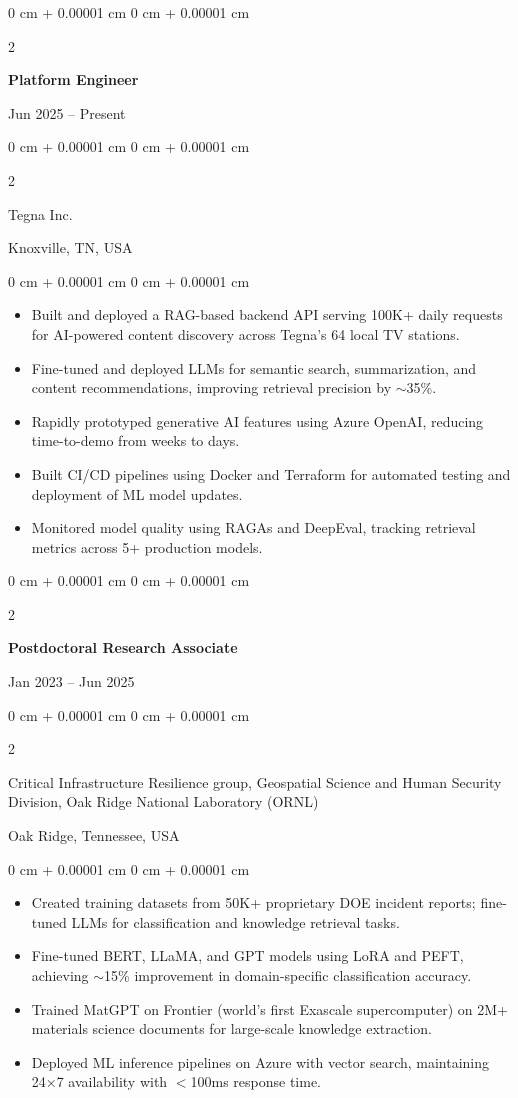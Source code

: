 \documentclass[10pt, letterpaper]{article}
\newenvironment{highlights}{
    \begin{itemize}[
        topsep=0.10 cm,
        parsep=0.10 cm,
        partopsep=0pt,
        itemsep=0pt,
        leftmargin=0 cm + 10pt
    ]
}{
    \end{itemize}
} %
\newenvironment{onecolentry}{
    \begin{adjustwidth}{
        0 cm + 0.00001 cm
    }{
        0 cm + 0.00001 cm
    }
}{
    \end{adjustwidth}
} %
\newenvironment{twocolentry}[2][]{
    \onecolentry
    \def\secondColumn{#2}
    \setcolumnwidth{\fill, 4.5 cm}
    \begin{paracol}{2}
}{
    \switchcolumn \raggedleft \secondColumn
    \end{paracol}
    \endonecolentry
} %
\begin{document}
    \begin{twocolentry}{Jun 2025 -- Present}
        \textbf{Platform Engineer}
    \end{twocolentry}
    \begin{twocolentry}{Knoxville, TN, USA}
       Tegna Inc.
    \end{twocolentry}
    
    \begin{onecolentry}
        \begin{highlights}
            \item Built and deployed a RAG-based backend API serving 100K+ daily requests for AI-powered content discovery across Tegna's 64 local TV stations.
            \item Fine-tuned and deployed LLMs for semantic search, summarization, and content recommendations, improving retrieval precision by $\sim$35\%.
            \item Rapidly prototyped generative AI features using Azure OpenAI, reducing time-to-demo from weeks to days.
            \item Built CI/CD pipelines using Docker and Terraform for automated testing and deployment of ML model updates.
            \item Monitored model quality using RAGAs and DeepEval, tracking retrieval metrics across 5+ production models.
        \end{highlights}
    \end{onecolentry}

\vspace{2mm}
    
    \begin{twocolentry}{Jan 2023 -- Jun 2025}
        \textbf{Postdoctoral Research Associate}
    \end{twocolentry}
    \begin{twocolentry}{Oak Ridge, Tennessee, USA}
        Critical Infrastructure Resilience group, Geospatial Science and Human Security Division, Oak Ridge National Laboratory (ORNL)
    \end{twocolentry}
    \vspace{0.10 cm}
    \begin{onecolentry}
        \begin{highlights}
            \item Created training datasets from 50K+ proprietary DOE incident reports; fine-tuned LLMs for classification and knowledge retrieval tasks.
            \item Fine-tuned BERT, LLaMA, and GPT models using LoRA and PEFT, achieving $\sim$15\% improvement in domain-specific classification accuracy.
            \item Trained MatGPT on Frontier (world’s first Exascale supercomputer) on 2M+ materials science documents for large-scale knowledge extraction.
            \item Deployed ML inference pipelines on Azure with vector search, maintaining 24×7 availability with $<$100ms response time.
        \end{highlights}
    \end{onecolentry}
\end{document}
